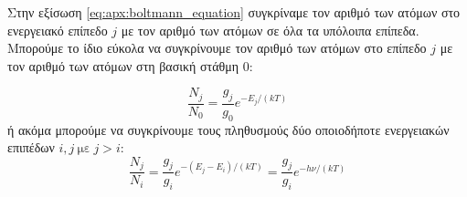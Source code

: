 Στην εξίσωση \eqref{eq:apx:boltmann_equation} συγκρίναμε τον αριθμό των ατόμων στο ενεργειακό επίπεδο $j$ με τον αριθμό των ατόμων σε όλα τα υπόλοιπα επίπεδα. Μπορούμε το ίδιο εύκολα να συγκρίνουμε τον αριθμό των ατόμων στο επίπεδο $j$ με τον αριθμό των ατόμων στη βασική στάθμη $0$:

\begin{equation}
    \label{eq:apx:ground_state}
    \frac{N_j}{N_0} = \frac{g_j}{g_0} e^{-E_j/(kT)}
\end{equation}
ή ακόμα μπορούμε να συγκρίνουμε τους πληθυσμούς δύο οποιοδήποτε ενεργειακών επιπέδων $i,j \ \text{με} \ j>i$:
\begin{equation}
    \label{eq:apx:boltzmann_two_levels}
    \frac{N_j}{N_i} = \frac{g_j}{g_i} e^{- (E_j - E_i)/ (kT)} = \frac{g_j}{g_i} e^{-h\nu/(kT)}
\end{equation}

